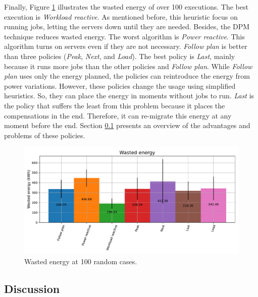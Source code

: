 Finally, Figure \ref{fig:energy_diff} illustrates the wasted energy of over 100 executions. The best execution is \emph{Workload reactive}. As mentioned before, this heuristic focus on running jobs, letting the servers down until they are needed. Besides, the DPM technique reduces wasted energy. The worst algorithm is \emph{Power reactive}. This algorithm turns on servers even if they are not necessary. \emph{Follow plan} is better than three policies (\emph{Peak}, \emph{Next}, and \emph{Load}). The best policy is \emph{Last}, mainly because it runs more jobs than the other policies and \emph{Follow plan}. While \emph{Follow plan} uses only the energy planned, the policies can reintroduce the energy from power variations. However, these policies change the usage using simplified heuristics. So, they can place the energy in moments without jobs to run. \emph{Last} is the policy that suffers the least from this problem because it places the compensations in the end. Therefore, it can re-migrate this energy at any moment before the end. Section \ref{sec:compensation_discussion} presents an overview of the advantages and problems of these policies. 

\begin{figure}[!htb]
    \centering
    \includegraphics[scale=0.55]{Images/Compensations/energy_diff.pdf}
    \caption{Wasted energy at 100 random cases.}
    \label{fig:energy_diff}
\end{figure}

\clearpage

\subsection{Discussion}
\label{sec:compensation_discussion}

